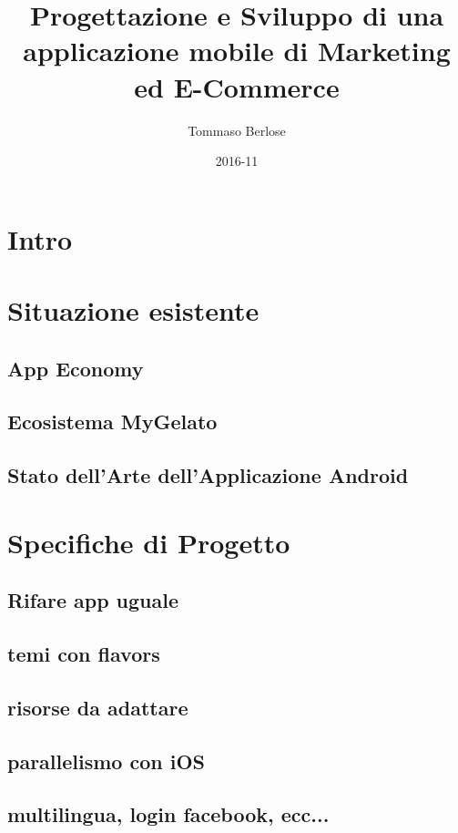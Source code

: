 \documentclass{article}
\title{Progettazione e Sviluppo di una applicazione mobile di Marketing ed E-Commerce}
\date{2016-11}
\author{Tommaso Berlose}
\begin{document}
  \maketitle
  \newpage
  \tableofcontents
  \newpage
  
  \section*{Intro}
  \newpage
  \section{Situazione esistente}

  \subsection{App Economy}

  \subsection{Ecosistema MyGelato}

  \subsection{Stato dell’Arte dell’Applicazione Android}
  \newpage
  \section{Specifiche di Progetto}

  \subsection{Rifare app uguale}

  \subsection{temi con flavors}

  \subsection{risorse da adattare}

  \subsection{parallelismo con iOS}

  \subsection{multilingua, login facebook, ecc...}
  \newpage
\end{document}
